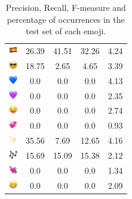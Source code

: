 \documentclass{article}
\begin{document}
\begin{table}
\begin{tabular}{|c|ccc|c|}
\includegraphics[height=0.37cm,width=0.37cm]{img/Spain.png} & 26.39 & 41.51 & 32.26 & 4.24\\ 
\includegraphics[height=0.37cm,width=0.37cm]{img/smiling_face_with_sunglasses.png} & 18.75 & 2.65 & 4.65 & 3.39\\ 
\includegraphics[height=0.37cm,width=0.37cm]{img/blue_heart.png} & 0.0 & 0.0 & 0.0 & 4.13\\ 
\includegraphics[height=0.37cm,width=0.37cm]{img/purple_heart.png} & 0.0 & 0.0 & 0.0 & 2.35\\ 
\includegraphics[height=0.37cm,width=0.37cm]{img/winking_face_with_tongue.png} & 0.0 & 0.0 & 0.0 & 2.74\\ 
\includegraphics[height=0.37cm,width=0.37cm]{img/revolving_hearts.png} & 0.0 & 0.0 & 0.0 & 0.93\\ 
\includegraphics[height=0.37cm,width=0.37cm]{img/sparkles.png} & 35.56 & 7.69 & 12.65 & 4.16\\ 
\includegraphics[height=0.37cm,width=0.37cm]{img/musical_notes.png} & 15.69 & 15.09 & 15.38 & 2.12\\ 
\includegraphics[height=0.37cm,width=0.37cm]{img/heart_with_arrow.png} & 0.0 & 0.0 & 0.0 & 1.34\\ 
\includegraphics[height=0.37cm,width=0.37cm]{img/beaming_face_with_smiling_eyes.png} & 0.0 & 0.0 & 0.0 & 2.09\\ 

\hline
\end{tabular}
\caption{\label{table:emoji_detailed} Precision, Recall, F-measure and percentage of occurrences in the test set of each emoji.}
\end{table}
\end{document}
